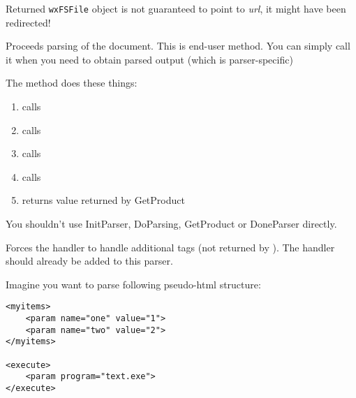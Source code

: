 Returned {\tt wxFSFile} object is not guaranteed to point to {\it url}, it might
have been redirected!

\label{wxhtmlparserparse}


Proceeds parsing of the document. This is end-user method. You can simply
call it when you need to obtain parsed output (which is parser-specific)

The method does these things:

\begin{enumerate}\itemsep=0pt
\item calls 
\item calls 
\item calls 
\item calls 
\item returns value returned by GetProduct
\end{enumerate}

You shouldn't use InitParser, DoParsing, GetProduct or DoneParser directly.

\label{wxhtmlparserpushtaghandler}


Forces the handler to handle additional tags 
(not returned by ). 
The handler should already be added to this parser.




Imagine you want to parse following pseudo-html structure:

\begin{verbatim}
<myitems>
    <param name="one" value="1">
    <param name="two" value="2">
</myitems>

<execute>
    <param program="text.exe">
</execute>
\end{verbatim}

